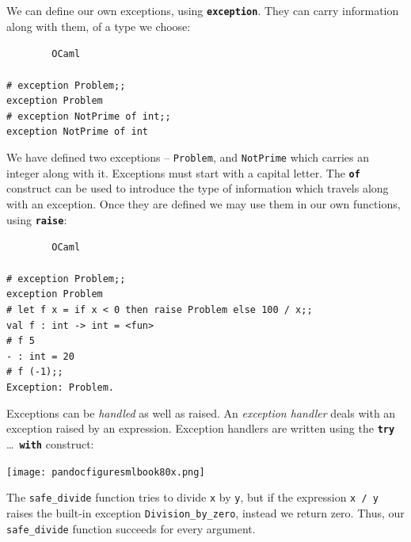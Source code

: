 \documentclass[]{book}
\newcommand{\smspace}{\vspace{4mm}}
\begin{document}
We can define our own exceptions, using \textbf{\texttt{exception}}. They can carry information along with them, of a type we choose:

\smspace
\noindent\verb!        OCaml!\\
\noindent\\
\noindent\verb!# exception Problem;;!\\
\noindent\verb!exception Problem!\\
\noindent\verb!# exception NotPrime of int;;!\\
\noindent\verb!exception NotPrime of int!
\smspace

\noindent We have defined two exceptions -- \texttt{Problem}, and \texttt{NotPrime} which carries an integer along with it. Exceptions must start with a capital letter. The \textbf{\texttt{of}} construct can be used to introduce the type of information which travels along with an exception. Once they are defined we may use them in our own functions, using \textbf{\texttt{raise}}:

\smspace
\noindent\verb!        OCaml!\\
\noindent\\
\noindent\verb!# exception Problem;;!\\
\noindent\verb!exception Problem!\\
\noindent\verb!# let f x = if x < 0 then raise Problem else 100 / x;;!\\
\noindent\verb!val f : int -> int = <fun>!\\
\noindent\verb!# f 5!\\
\noindent\verb!- : int = 20!\\
\noindent\texttt{\# f (-1);;}\\
\noindent\verb!Exception: Problem.!
\smspace

\noindent Exceptions can be \textit{handled} as well as raised. An \textit{exception handler} deals with an exception raised by an expression. Exception handlers are written using the \textbf{\texttt{try}} \ldots\ \textbf{\texttt{with}} construct:

\medskip
\begin{center}
\noindent\texttt{[image: pandocfiguresmlbook80x.png]}
\end{center}
\medskip

\noindent The \texttt{safe\_divide} function tries to divide \texttt{x} by \texttt{y}, but if the expression \texttt{x / y} raises the built-in exception \texttt{Division\_by\_zero}, instead we return zero. Thus, our \texttt{safe\_divide} function succeeds for every argument. 
\end{document}
